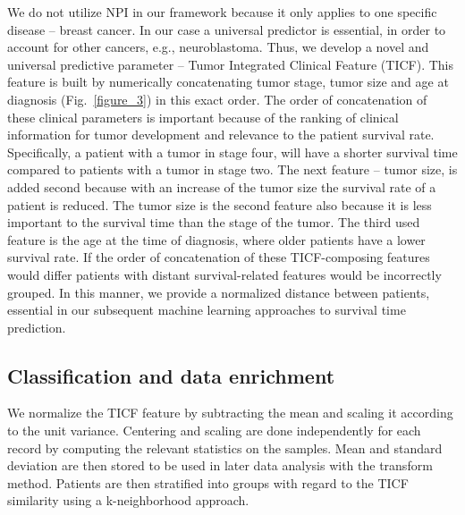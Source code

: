 \documentclass{bmcart}
\begin{document}
We do not utilize NPI in our framework because it only applies to one
specific disease -- breast cancer. In our case a universal predictor is
essential, in order to account for other cancers, e.g., neuroblastoma.
Thus, we develop a novel and universal predictive parameter -- Tumor
Integrated Clinical Feature (TICF). This feature is built by
numerically concatenating tumor stage, tumor size and age at diagnosis
(Fig.~\ref{figure_3}) in this exact order. The order of concatenation of these
clinical parameters is important because of the ranking of clinical
information for tumor development and relevance to the patient survival
rate. Specifically, a patient with a tumor in stage four, will have a
shorter survival time compared to patients with a tumor in stage two.
The next feature -- tumor size, is added second because with an
increase of the tumor size the survival rate of a patient is reduced.
The tumor size is the second feature also because it is less important
to the survival time than the stage of the tumor. The third used
feature is the age at the time of diagnosis, where older patients have
a lower survival rate. If the order of concatenation of these
TICF-composing features would differ patients with distant
survival-related features would be incorrectly grouped. In this manner,
we provide a normalized distance between patients, essential in our
subsequent machine learning approaches to survival time prediction.



\subsection{Classification and data enrichment }

We normalize the TICF feature by subtracting the mean and scaling it
according to the unit variance. Centering and scaling are done
independently for each record by computing the relevant statistics on
the samples. Mean and standard deviation are then stored to be used in
later data analysis with the transform method. Patients are then
stratified into groups with regard to the TICF similarity using a
k-neighborhood approach. 
\end{document}
